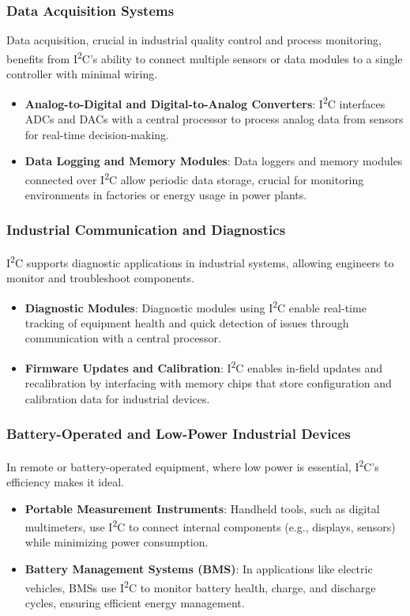 \documentclass[a4paper,12pt]{report}
\begin{document}
\subsubsection*{Data Acquisition Systems}
Data acquisition, crucial in industrial quality control and process monitoring, benefits from I\textsuperscript{2}C’s ability to connect multiple sensors or data modules to a single controller with minimal wiring.
\begin{itemize}
    \item \textbf{Analog-to-Digital and Digital-to-Analog Converters}: I\textsuperscript{2}C interfaces ADCs and DACs with a central processor to process analog data from sensors for real-time decision-making.
    \item \textbf{Data Logging and Memory Modules}: Data loggers and memory modules connected over I\textsuperscript{2}C allow periodic data storage, crucial for monitoring environments in factories or energy usage in power plants.
\end{itemize}

\subsubsection*{Industrial Communication and Diagnostics}
I\textsuperscript{2}C supports diagnostic applications in industrial systems, allowing engineers to monitor and troubleshoot components.
\begin{itemize}
    \item \textbf{Diagnostic Modules}: Diagnostic modules using I\textsuperscript{2}C enable real-time tracking of equipment health and quick detection of issues through communication with a central processor.
    \item \textbf{Firmware Updates and Calibration}: I\textsuperscript{2}C enables in-field updates and recalibration by interfacing with memory chips that store configuration and calibration data for industrial devices.
\end{itemize}

\subsubsection*{Battery-Operated and Low-Power Industrial Devices}
In remote or battery-operated equipment, where low power is essential, I\textsuperscript{2}C’s efficiency makes it ideal.
\begin{itemize}
    \item \textbf{Portable Measurement Instruments}: Handheld tools, such as digital multimeters, use I\textsuperscript{2}C to connect internal components (e.g., displays, sensors) while minimizing power consumption.
    \item \textbf{Battery Management Systems (BMS)}: In applications like electric vehicles, BMSs use I\textsuperscript{2}C to monitor battery health, charge, and discharge cycles, ensuring efficient energy management.
\end{itemize}
\end{document}
